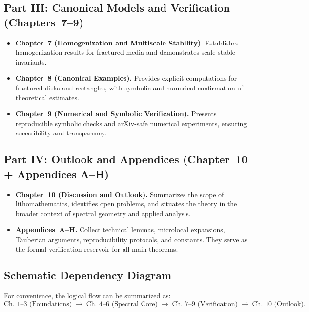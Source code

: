 \subsection*{Part III: Canonical Models and Verification (Chapters~7--9)}

\begin{itemize}
    \item \textbf{Chapter~7 (Homogenization and Multiscale Stability).}
    Establishes homogenization results for fractured media and
    demonstrates scale-stable invariants.
    \item \textbf{Chapter~8 (Canonical Examples).} Provides explicit
    computations for fractured disks and rectangles, with symbolic and
    numerical confirmation of theoretical estimates.
    \item \textbf{Chapter~9 (Numerical and Symbolic Verification).}
    Presents reproducible symbolic checks and arXiv-safe numerical
    experiments, ensuring accessibility and transparency.
\end{itemize}

\subsection*{Part IV: Outlook and Appendices (Chapter~10 + Appendices A--H)}

\begin{itemize}
    \item \textbf{Chapter~10 (Discussion and Outlook).} Summarizes the
    scope of lithomathematics, identifies open problems, and situates the
    theory in the broader context of spectral geometry and applied
    analysis.
    \item \textbf{Appendices~A--H.} Collect technical lemmas, microlocal
    expansions, Tauberian arguments, reproducibility protocols, and
    constants. They serve as the formal verification reservoir for all
    main theorems.
\end{itemize}

\subsection*{Schematic Dependency Diagram}

For convenience, the logical flow can be summarized as:
\[
\text{Ch.~1--3 (Foundations)} \;\longrightarrow\;
\text{Ch.~4--6 (Spectral Core)} \;\longrightarrow\;
\text{Ch.~7--9 (Verification)} \;\longrightarrow\;
\text{Ch.~10 (Outlook)}.
\]

